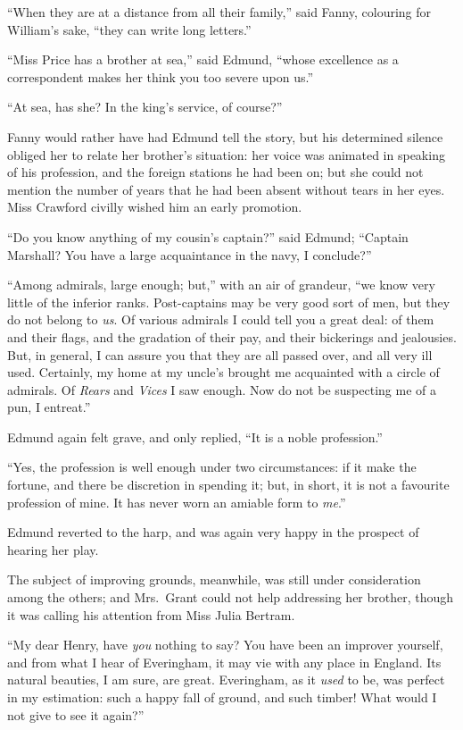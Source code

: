 \documentclass{article}
\begin{document}
``When they are at a distance from all their family,''
said Fanny, colouring for William's sake, ``they can write
long letters.''

``Miss Price has a brother at sea,'' said Edmund,
``whose excellence as a correspondent makes her think
you too severe upon us.''

``At sea, has she?  In the king's service, of course?''

Fanny would rather have had Edmund tell the story,
but his determined silence obliged her to relate her
brother's situation:  her voice was animated in speaking
of his profession, and the foreign stations he had been on;
but she could not mention the number of years that he
had been absent without tears in her eyes.  Miss Crawford
civilly wished him an early promotion.

``Do you know anything of my cousin's captain?'' said Edmund;
``Captain Marshall?  You have a large acquaintance in the navy,
I conclude?''

``Among admirals, large enough; but,'' with an air of grandeur,
``we know very little of the inferior ranks.  Post-captains may
be very good sort of men, but they do not belong to \emph{us}.
Of various admirals I could tell you a great deal:
of them and their flags, and the gradation of their pay,
and their bickerings and jealousies.  But, in general,
I can assure you that they are all passed over, and all
very ill used.  Certainly, my home at my uncle's brought
me acquainted with a circle of admirals.  Of \emph{Rears} and
\emph{Vices} I saw enough.  Now do not be suspecting me of a pun,
I entreat.''

Edmund again felt grave, and only replied, ``It is
a noble profession.''

``Yes, the profession is well enough under two circumstances:
if it make the fortune, and there be discretion in spending it;
but, in short, it is not a favourite profession of mine.
It has never worn an amiable form to \emph{me}.''

Edmund reverted to the harp, and was again very happy
in the prospect of hearing her play.

The subject of improving grounds, meanwhile, was still
under consideration among the others; and Mrs.\ Grant could
not help addressing her brother, though it was calling
his attention from Miss Julia Bertram.

``My dear Henry, have \emph{you} nothing to say?  You have been
an improver yourself, and from what I hear of Everingham,
it may vie with any place in England.  Its natural beauties,
I am sure, are great.  Everingham, as it \emph{used} to be,
was perfect in my estimation:  such a happy fall of ground,
and such timber!  What would I not give to see it again?''
\end{document}
